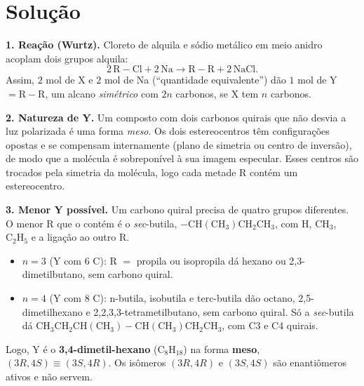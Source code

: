 \documentclass{article}%
\begin{document}
\section*{Solução}

\textbf{1. Reação (Wurtz).} Cloreto de alquila e sódio metálico em meio anidro acoplam dois grupos alquila:
\[
2\,\mathrm{R{-}Cl} + 2\,\mathrm{Na} \longrightarrow \mathrm{R{-}R} + 2\,\mathrm{NaCl}.
\]
Assim, $2$ mol de X e $2$ mol de Na (``quantidade equivalente'') dão $1$ mol de Y $=\mathrm{R{-}R}$, um alcano \emph{simétrico} com $2n$ carbonos, se X tem $n$ carbonos.

\textbf{2. Natureza de Y.} Um composto com dois carbonos quirais que não desvia a luz polarizada é uma forma \emph{meso}. Os dois estereocentros têm configurações opostas e se compensam internamente (plano de simetria ou centro de inversão), de modo que a molécula é sobreponível à sua imagem especular. Esses centros são trocados pela simetria da molécula, logo cada metade R contém um estereocentro.

\textbf{3. Menor Y possível.} Um carbono quiral precisa de quatro grupos diferentes. O menor R que o contém é o \emph{sec}-butila, $\mathrm{{-}CH(CH_3)CH_2CH_3}$, com $\mathrm{H}$, $\mathrm{CH_3}$, $\mathrm{C_2H_5}$ e a ligação ao outro R.
\begin{itemize}
\item $n=3$ ($\mathrm{Y}$ com $6$ C): R $=$ propila ou isopropila dá hexano ou 2,3-dimetilbutano, sem carbono quiral.
\item $n=4$ ($\mathrm{Y}$ com $8$ C): n-butila, isobutila e terc-butila dão octano, 2,5-dimetilhexano e 2,2,3,3-tetrametilbutano, sem carbono quiral. Só a \emph{sec}-butila dá $\mathrm{CH_3CH_2CH(CH_3){-}CH(CH_3)CH_2CH_3}$, com C3 e C4 quirais.
\end{itemize}
Logo, Y é o \textbf{3,4-dimetil-hexano} ($\mathrm{C_8H_{18}}$) na forma \textbf{meso}, $(3R,4S)\equiv(3S,4R)$. Os isômeros $(3R,4R)$ e $(3S,4S)$ são enantiômeros ativos e não servem.
\end{document}
